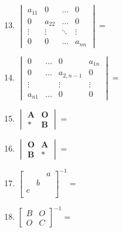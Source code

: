 \documentclass[a4paper,12pt]{article}
\begin{document}
    \hfill
    \begin{minipage}[t]{0.30\textwidth}
        \begin{enumerate}[leftmargin=0.2em, itemsep=1.1em]
            \setcounter{enumi}{12}
            \item $\begin{vmatrix}
                       a_{11} &      0  &  \dots      & 0        \\
                       0 & a_{22} &       \dots  &    0    \\
                       \vdots & \vdots & \ddots & \vdots       \\
                       0 & 0 & \dots  & a_{nn}
            \end{vmatrix}=$
            \item $\begin{vmatrix}
                       0      & \dots & 0         & a_{1n} \\
                       0      & \dots & a_{2,n-1} & 0 \\
                       \vdots &       & \vdots    & \vdots \\
                       a_{n1} & \dots & 0 & 0
            \end{vmatrix} =$
            \item $\begin{vmatrix}
                       \mathbf{A} & \mathbf{O} \\
                       *          & \mathbf{B}
            \end{vmatrix} =$
            \item $\begin{vmatrix}
                       \mathbf{O} & \mathbf{A} \\
                       \mathbf{B} & *
            \end{vmatrix} =$
            \item $\begin{bmatrix}
                       &   & a \\
                       & b &   \\
                       c &   &   \\
            \end{bmatrix}^{-1} =$
            \item $\begin{bmatrix}
                       B & O \\
                       O & C
            \end{bmatrix}^{-1} =$
        \end{enumerate}
    \end{minipage}
    \hfill
\end{document}
